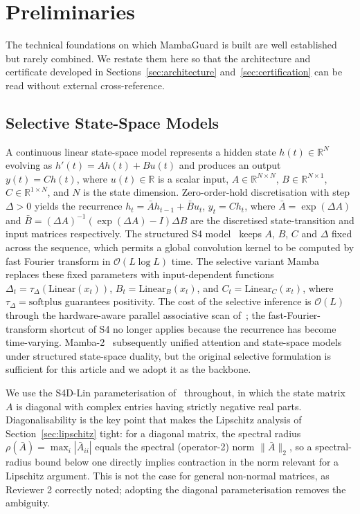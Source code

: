 \documentclass{ieeeaccess}
\newcommand{\R}{\mathbb{R}}
\newcommand{\calO}{\mathcal{O}}
\begin{document}
\section{Preliminaries}
\label{sec:prelim}
The technical foundations on which MambaGuard is built are well established but rarely combined. We restate them here so that the architecture and certificate developed in Sections~\ref{sec:architecture} and~\ref{sec:certification} can be read without external cross-reference.

\subsection{Selective State-Space Models}
A continuous linear state-space model represents a hidden state $h(t)\in\R^{N}$ evolving as $h'(t)=Ah(t)+Bu(t)$ and produces an output $y(t)=Ch(t)$, where $u(t)\in\R$ is a scalar input, $A\in\R^{N\times N}$, $B\in\R^{N\times 1}$, $C\in\R^{1\times N}$, and $N$ is the state dimension. Zero-order-hold discretisation with step $\Delta>0$ yields the recurrence $h_{t}=\bar{A}h_{t-1}+\bar{B}u_{t}$, $y_{t}=Ch_{t}$, where $\bar{A}=\exp(\Delta A)$ and $\bar{B}=(\Delta A)^{-1}(\exp(\Delta A)-I)\Delta B$ are the discretised state-transition and input matrices respectively. The structured S4 model~\cite{Gu2022S4} keeps $A$, $B$, $C$ and $\Delta$ fixed across the sequence, which permits a global convolution kernel to be computed by fast Fourier transform in $\calO(L\log L)$ time. The selective variant Mamba~\cite{Gu2023Mamba} replaces these fixed parameters with input-dependent functions $\Delta_{t}=\tau_{\Delta}(\mathrm{Linear}(x_{t}))$, $B_{t}=\mathrm{Linear}_{B}(x_{t})$, and $C_{t}=\mathrm{Linear}_{C}(x_{t})$, where $\tau_{\Delta}=\mathrm{softplus}$ guarantees positivity. The cost of the selective inference is $\calO(L)$ through the hardware-aware parallel associative scan of~\cite{Gu2023Mamba}; the fast-Fourier-transform shortcut of S4 no longer applies because the recurrence has become time-varying. Mamba-2~\cite{Dao2024Mamba2} subsequently unified attention and state-space models under structured state-space duality, but the original selective formulation is sufficient for this article and we adopt it as the backbone.

We use the S4D-Lin parameterisation of~\cite{Gu2022S4D} throughout, in which the state matrix $A$ is diagonal with complex entries having strictly negative real parts. Diagonalisability is the key point that makes the Lipschitz analysis of Section~\ref{sec:lipschitz} tight: for a diagonal matrix, the spectral radius $\rho(\bar A)=\max_{i}|\bar A_{ii}|$ equals the spectral (operator-2) norm $\|\bar A\|_{2}$, so a spectral-radius bound below one directly implies contraction in the norm relevant for a Lipschitz argument. This is not the case for general non-normal matrices, as Reviewer 2 correctly noted; adopting the diagonal parameterisation removes the ambiguity.
\end{document}
